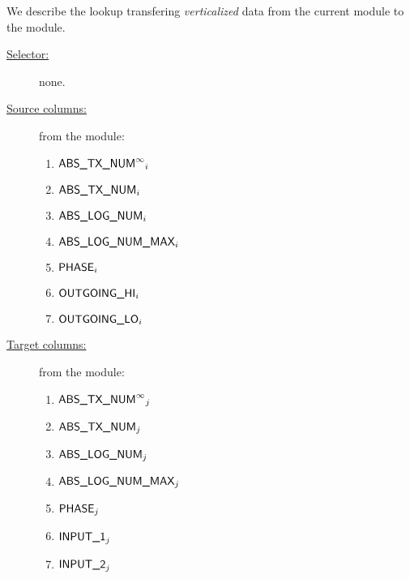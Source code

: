 We describe the lookup transfering \emph{verticalized} data from the current module to the \rlpTxnRcptMod{} module.
\begin{description}
	\item[\underline{Selector:}] none.
	\item[\underline{Source columns:}] from the \logInfoMod{} module:
	\begin{enumerate}
			\item $\textsf{ABS\_TX\_NUM}^\infty{}_{i}$
			\item $\textsf{ABS\_TX\_NUM}{}_{i}$
			\item $\textsf{ABS\_LOG\_NUM}{}_{i}$
			\item $\textsf{ABS\_LOG\_NUM\_MAX}{}_{i}$
			\item $\textsf{PHASE}{}_{i}$
			\item $\textsf{OUTGOING}\textsf{\_HI}{}_{i}$
			\item $\textsf{OUTGOING}\textsf{\_LO}{}_{i}$
	\end{enumerate}
\item[\underline{Target columns:}] from the \rlpTxnRcptMod{} module: 
	\begin{enumerate}
			\item $\textsf{ABS\_TX\_NUM}^\infty{}_{j}$
			\item $\textsf{ABS\_TX\_NUM}{}_{j}$
			\item $\textsf{ABS\_LOG\_NUM}{}_{j}$
			\item $\textsf{ABS\_LOG\_NUM\_MAX}{}_{j}$		
			\item $\textsf{PHASE}_{j}$
			\item $\textsf{INPUT\_1}_{j}$
			\item $\textsf{INPUT\_2}_{j}$
	\end{enumerate} 
\end{description}
